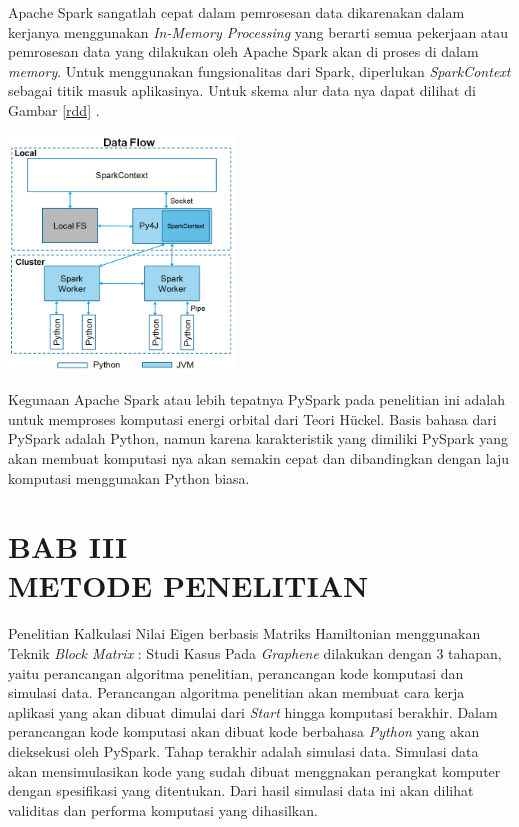 \documentclass[12pt,a4paper]{report}
\begin{document}
	Apache Spark sangatlah cepat dalam pemrosesan data dikarenakan dalam kerjanya menggunakan \textit{In-Memory Processing} yang berarti semua pekerjaan atau pemrosesan data yang dilakukan oleh Apache Spark akan di proses di dalam \textit{memory}\cite{Bekker2017}. Untuk menggunakan fungsionalitas dari Spark, diperlukan \textit{SparkContext} sebagai titik masuk aplikasinya. Untuk skema alur data nya dapat dilihat di Gambar \ref{rdd} \cite{Tutorialspoint}.
	\begin{center}
		\includegraphics[width=6cm]{gambar/sparkcontext.png}
	\end{center}

	Kegunaan Apache Spark atau lebih tepatnya PySpark pada penelitian ini adalah untuk memproses komputasi energi orbital dari Teori Hückel. Basis bahasa dari PySpark adalah Python, namun karena karakteristik yang dimiliki PySpark yang akan membuat komputasi nya akan semakin cepat dan dibandingkan dengan laju komputasi menggunakan Python biasa.
	
\chapter*{BAB III \\ METODE PENELITIAN}
\setcounter{chapter}{3}
\setcounter{section}{0}
\setcounter{figure}{0}
\setcounter{equation}{0}
\thispagestyle{myplain}

Penelitian Kalkulasi Nilai Eigen berbasis Matriks Hamiltonian menggunakan Teknik \textit{Block Matrix} : Studi Kasus Pada \textit{Graphene} dilakukan dengan 3 tahapan, yaitu perancangan algoritma penelitian, perancangan kode komputasi dan simulasi data. Perancangan algoritma penelitian akan membuat cara kerja aplikasi yang akan dibuat dimulai dari \textit{Start} hingga komputasi berakhir. Dalam perancangan kode komputasi akan dibuat kode berbahasa \textit{Python} yang akan dieksekusi oleh PySpark. Tahap terakhir adalah simulasi data. Simulasi data akan mensimulasikan kode yang sudah dibuat menggnakan perangkat komputer dengan spesifikasi yang ditentukan. Dari hasil simulasi data ini akan dilihat validitas dan performa komputasi yang dihasilkan.
\end{document}

